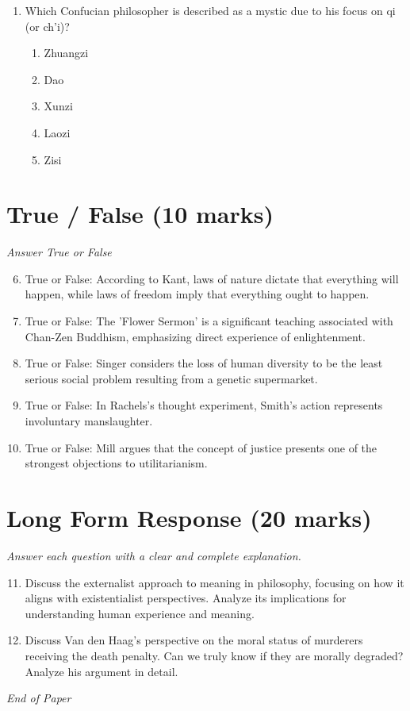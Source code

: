 \documentclass[12pt]{article}
\begin{document}
\begin{enumerate}[label=\arabic*.]
\begin{enumerate}[label=(\alph*)]
    \item loving God.
    \item pleasure
    \item achieving personal success
\end{enumerate}
\item Which Confucian philosopher is described as a mystic due to his focus on qi (or ch'i)?
\begin{enumerate}[label=(\alph*)]
    \item Zhuangzi
    \item Dao
    \item Xunzi
    \item Laozi
    \item Zisi
\end{enumerate}
\end{enumerate}

\section*{True / False (10 marks)}
\textit{Answer True or False}
\begin{enumerate}[label=\arabic*.]
\setcounter{enumi}{5}
\item True or False: According to Kant, laws of nature dictate that everything will happen, while laws of freedom imply that everything ought to happen.
\item True or False: The 'Flower Sermon' is a significant teaching associated with Chan-Zen Buddhism, emphasizing direct experience of enlightenment.
\item True or False: Singer considers the loss of human diversity to be the least serious social problem resulting from a genetic supermarket.
\item True or False: In Rachels's thought experiment, Smith's action represents involuntary manslaughter.
\item True or False: Mill argues that the concept of justice presents one of the strongest objections to utilitarianism.
\end{enumerate}

\section*{Long Form Response (20 marks)}
\textit{Answer each question with a clear and complete explanation.}
\begin{enumerate}[label=\arabic*.]
\setcounter{enumi}{10}
\item Discuss the externalist approach to meaning in philosophy, focusing on how it aligns with existentialist perspectives. Analyze its implications for understanding human experience and meaning.
\item Discuss Van den Haag's perspective on the moral status of murderers receiving the death penalty. Can we truly know if they are morally degraded? Analyze his argument in detail.
\end{enumerate}

\vfill
\noindent\textit{End of Paper}
\end{document}
